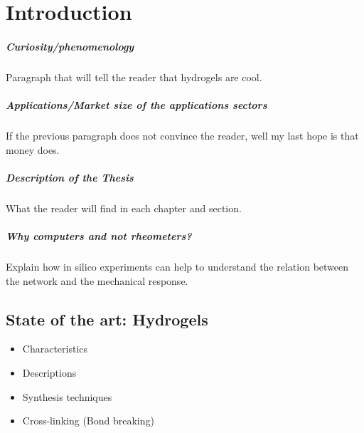 \chapter{Introduction}\label{ch1:Intro}


\paragraph{Curiosity/phenomenology} Paragraph that will tell the reader that hydrogels are cool.

\paragraph{Applications/Market size of the applications sectors} If the previous paragraph does not convince the reader, well my last hope is that money does.

\paragraph{Description of the Thesis} What the reader will find in each chapter and section.

\paragraph{Why computers and not rheometers?} Explain how in silico experiments can help to understand the relation between the network and the mechanical response.

\section{State of the art: Hydrogels}\label{ch1:StateArt}

\begin{itemize}
    \item Characteristics
    \item Descriptions 
    \item Synthesis techniques
    \item Cross-linking (Bond breaking)
\end{itemize}

